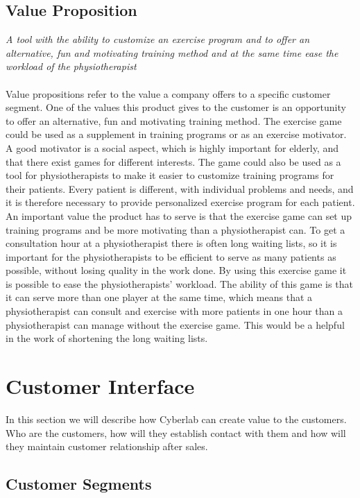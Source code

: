 \subsection{Value Proposition}
\emph{A tool with the ability to customize an exercise program and to offer an alternative, fun and motivating training method and at the same time ease the workload of the physiotherapist}\\ \\
Value propositions refer to the value a company offers to a specific customer segment. One of the values this product gives to the customer is an opportunity to offer an alternative, fun and motivating training method. The exercise game could be used as a supplement in training programs or as an exercise motivator. A good motivator is a social aspect, which is highly important for elderly, and that there exist games for different interests. The game could also be used as a tool for physiotherapists to make it easier to customize training programs for their patients. Every patient is different, with individual problems and needs, and it is therefore necessary to provide personalized exercise program for each patient. An important value the product has to serve is that the exercise game can set up training programs and be more motivating than a physiotherapist can. To get a consultation hour at a physiotherapist there is often long waiting lists, so it is important for the physiotherapists to be efficient to serve as many patients as possible, without losing quality in the work done. By using this exercise game it is possible to ease the physiotherapists’ workload. The ability of this game is that it can serve more than one player at the same time, which means that a physiotherapist can consult and exercise with more patients in one hour than a physiotherapist can manage without the exercise game. This would be a helpful in the work of shortening the long waiting lists.
\section{Customer Interface}
In this section we will describe how Cyberlab can create value to the customers. Who are the customers, how will they establish contact with them and how will they maintain customer relationship after sales.
\subsection{Customer Segments}

